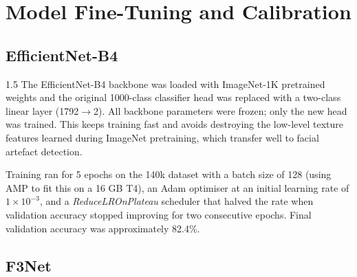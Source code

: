 \section{Model Fine-Tuning and Calibration}

\subsection{EfficientNet-B4}

\begin{spacing}{1.5}
The EfficientNet-B4 backbone was loaded with ImageNet-1K pretrained weights and the original 1000-class classifier head was replaced with a two-class linear layer (1792$\to$2). All backbone parameters were frozen; only the new head was trained. This keeps training fast and avoids destroying the low-level texture features learned during ImageNet pretraining, which transfer well to facial artefact detection.

Training ran for 5 epochs on the 140k dataset with a batch size of 128 (using AMP to fit this on a 16 GB T4), an Adam optimiser at an initial learning rate of $1 \times 10^{-3}$, and a \textit{ReduceLROnPlateau} scheduler that halved the rate when validation accuracy stopped improving for two consecutive epochs. Final validation accuracy was approximately 82.4\%.
\end{spacing}

\subsection{F3Net}


